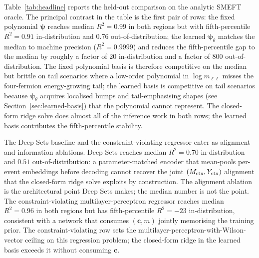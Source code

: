\documentclass[11pt,a4paper]{article}
\newcommand{\mll}{m_{\ell\ell}}
\newcommand{\psib}{\bm{\psi}}
\begin{document}
Table~\ref{tab:headline} reports the held-out comparison on the analytic SMEFT oracle. The principal contrast in the table is the first pair of rows: the fixed polynomial $\psib$ reaches median $R^2 = 0.99$ in both regions but with fifth-percentile $R^2 = 0.91$ in-distribution and $0.76$ out-of-distribution; the learned $\psib_\theta$ matches the median to machine precision ($R^2 = 0.9999$) and reduces the fifth-percentile gap to the median by roughly a factor of $20$ in-distribution and a factor of $800$ out-of-distribution. The fixed polynomial basis is therefore competitive on the median but brittle on tail scenarios where a low-order polynomial in $\log\mll$ misses the four-fermion energy-growing tail; the learned basis is competitive on tail scenarios because $\psib_\theta$ acquires localised bumps and tail-emphasising shapes (see Section~\ref{sec:learned-basis}) that the polynomial cannot represent. The closed-form ridge solve does almost all of the inference work in both rows; the learned basis contributes the fifth-percentile stability.

The Deep Sets baseline and the constraint-violating regressor enter as alignment and information ablations. Deep Sets reaches median $R^2 = 0.70$ in-distribution and $0.51$ out-of-distribution: a parameter-matched encoder that mean-pools per-event embeddings before decoding cannot recover the joint $(M_{\rm ctx}, Y_{\rm ctx})$ alignment that the closed-form ridge solve exploits by construction. The alignment ablation is the architectural point Deep Sets makes; the median number is not the point. The constraint-violating multilayer-perceptron regressor reaches median $R^2 = 0.96$ in both regions but has fifth-percentile $R^2 = -23$ in-distribution, consistent with a network that consumes $(\bm{c}, m)$ jointly memorising the training prior. The constraint-violating row sets the multilayer-perceptron-with-Wilson-vector ceiling on this regression problem; the closed-form ridge in the learned basis exceeds it without consuming $\bm{c}$.
\end{document}
